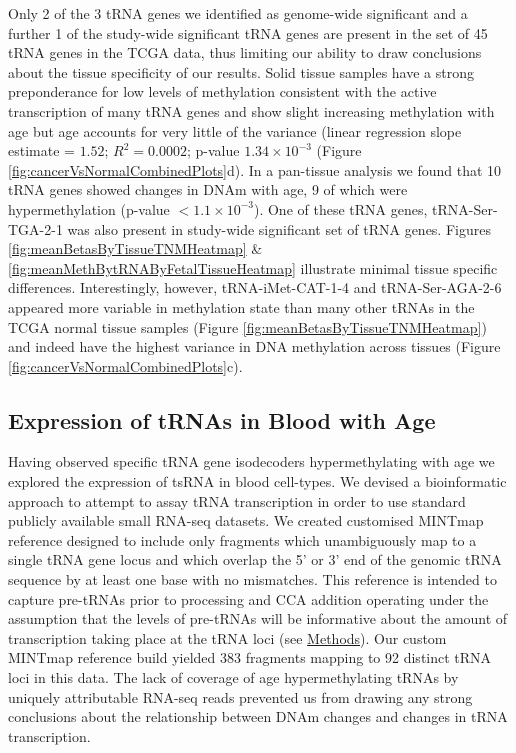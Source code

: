 \documentclass[]{book}
\begin{document}
Only 2 of the 3 tRNA genes we identified as genome-wide significant and a further 1 of the study-wide significant tRNA genes are present in the set of 45 tRNA genes in the TCGA data, thus limiting our ability to draw conclusions about the tissue specificity of our results.
Solid tissue samples have a strong preponderance for low levels of methylation consistent with the active transcription of many tRNA genes and show slight increasing methylation with age but age accounts for very little of the variance (linear regression slope estimate = \(1.52\); \(R^2= 0.0002\); p-value \(1.34\times10^{-3}\) (Figure \ref{fig:cancerVsNormalCombinedPlots}d).
In a pan-tissue analysis we found that 10 tRNA genes showed changes in DNAm with age, 9 of which were hypermethylation (p-value \(<1.1\times10^{-3}\)).
One of these tRNA genes, tRNA-Ser-TGA-2-1 was also present in study-wide significant set of tRNA genes.
Figures \ref{fig:meanBetasByTissueTNMHeatmap} \& \ref{fig:meanMethBytRNAByFetalTissueHeatmap} illustrate minimal tissue specific differences.
Interestingly, however, tRNA-iMet-CAT-1-4 and tRNA-Ser-AGA-2-6 appeared more variable in methylation state than many other tRNAs in the TCGA normal tissue samples (Figure \ref{fig:meanBetasByTissueTNMHeatmap}) and indeed have the highest variance in DNA methylation across tissues (Figure \ref{fig:cancerVsNormalCombinedPlots}c).

\hypertarget{expression-of-trnas-in-blood-with-age}{%
\subsection{Expression of tRNAs in Blood with Age}\label{expression-of-trnas-in-blood-with-age}}

Having observed specific tRNA gene isodecoders hypermethylating with age we explored the expression of tsRNA in blood cell-types.
We devised a bioinformatic approach to attempt to assay tRNA transcription in order to use standard publicly available small RNA-seq datasets.
We created customised MINTmap \citep{Loher2017} reference designed to include only fragments which unambiguously map to a single tRNA gene locus and which overlap the 5' or 3' end of the genomic tRNA sequence by at least one base with no mismatches.
This reference is intended to capture pre-tRNAs prior to processing and CCA addition operating under the assumption that the levels of pre-tRNAs will be informative about the amount of transcription taking place at the tRNA loci (see \protect\hyperlink{mintmapmethods}{Methods}).
Our custom MINTmap reference build yielded 383 fragments mapping to 92 distinct tRNA loci in this data.
The lack of coverage of age hypermethylating tRNAs by uniquely attributable RNA-seq reads prevented us from drawing any strong conclusions about the relationship between DNAm changes and changes in tRNA transcription.
\end{document}
